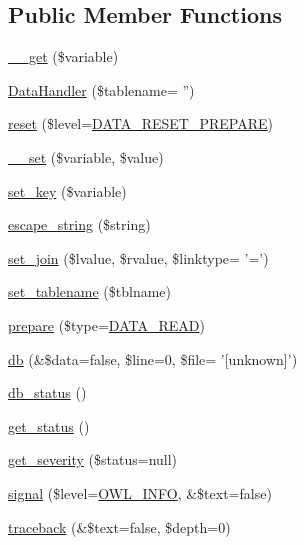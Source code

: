 \subsection*{Public Member Functions}
\begin{DoxyCompactItemize}
\item 
\hyperlink{classFormHandler_a371b8ded5110c6d66bc3a0c3e08fe085}{\_\-\_\-get} (\$variable)
\item 
\hyperlink{classDataHandler_aed5b2eb4ca7b2e4b0c1563d817d73c16}{DataHandler} (\$tablename= '')
\item 
\hyperlink{classDataHandler_ab89e1aaad9cd0a37f1c7f13c1d9c0d57}{reset} (\$level=\hyperlink{class_8datahandler_8php_a19a99423705b41e563424ae76d7fe184}{DATA\_\-RESET\_\-PREPARE})
\item 
\hyperlink{classDataHandler_a16c81c9564a7feaf530ce5d51ed99df7}{\_\-\_\-set} (\$variable, \$value)
\item 
\hyperlink{classDataHandler_a32ce223478b78a4ea9838a3c6ac7440c}{set\_\-key} (\$variable)
\item 
\hyperlink{classDataHandler_a435338a167a44a041af2895859abb0c9}{escape\_\-string} (\$string)
\item 
\hyperlink{classDataHandler_a9b77733f02e9d6281fc40df110c0ba70}{set\_\-join} (\$lvalue, \$rvalue, \$linktype= '=')
\item 
\hyperlink{classDataHandler_abcb68472abd7da8ee6296421f0a7f2e9}{set\_\-tablename} (\$tblname)
\item 
\hyperlink{classDataHandler_af3e7a17194e97300d499e9178f4913cb}{prepare} (\$type=\hyperlink{class_8datahandler_8php_ac28f74b49007773d24ca2207baac6d32}{DATA\_\-READ})
\item 
\hyperlink{classDataHandler_abb329fe5a97eb8df928aabfc8078ff23}{db} (\&\$data=false, \$line=0, \$file= '\mbox{[}unknown\mbox{]}')
\item 
\hyperlink{classDataHandler_a3c82ec0a40dabcc55dc203c96abf02d2}{db\_\-status} ()
\item 
\hyperlink{class__OWL_a99ec771fa2c5c279f80152cc09e489a8}{get\_\-status} ()
\item 
\hyperlink{class__OWL_adf9509ef96858be7bdd9414c5ef129aa}{get\_\-severity} (\$status=null)
\item 
\hyperlink{class__OWL_a51ba4a16409acf2a2f61f286939091a5}{signal} (\$level=\hyperlink{owl_8severitycodes_8php_a139328861128689f2f4def6a399d9057}{OWL\_\-INFO}, \&\$text=false)
\item 
\hyperlink{class__OWL_aa29547995d6741b7d2b90c1d4ea99a13}{traceback} (\&\$text=false, \$depth=0)
\end{DoxyCompactItemize}
